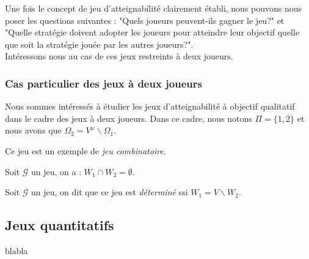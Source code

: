 	
	
	Une fois le concept de jeu d'atteignabilité clairement établi, nous pouvons nous poser les questions suivantes : "Quels joueurs peuvent-ils gagner le jeu?" et "Quelle stratégie doivent adopter les joueurs pour atteindre leur objectif quelle que soit la stratégie jouée par les autres joueurs?". \\
	
	Intéressons nous au cas de ces jeux restreints à deux joueurs.
	
	\subsubsection{Cas particulier des jeux à deux joueurs}
	Nous sommes intéressés à étudier les jeux d'atteignabilité à objectif qualitatif dans le cadre des jeux à deux joueurs. Dans ce cadre, nous notons $\Pi = \{1,2\}$ et nous avons que $\Omega _{2} = V^{\omega}\backslash \Omega _{1}$.
	\begin{rem}
		Ce jeu est un exemple de \textit{jeu combinatoire}.
	\end{rem}
	
	\begin{propriete}
		Soit $\mathcal{G}$ un jeu, on a : $W_{1}\cap W_{2} = \emptyset$.
	\end{propriete}
	\begin{demonstration}
		\todo{}
	\end{demonstration}
	
	\begin{defi}
		Soit $\mathcal{G}$ un jeu, on dit que ce jeu est \textit{déterminé} ssi $W_{1} = V \backslash W_{2}$.
	\end{defi}
		
		
\subsection{Jeux quantitatifs }
	blabla
